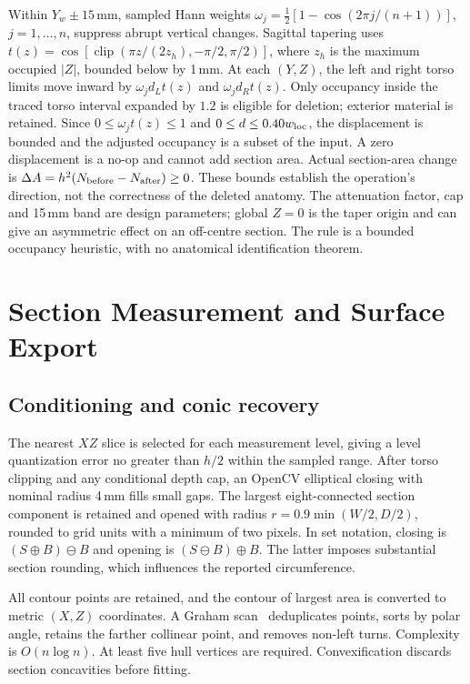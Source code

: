 \documentclass[11pt,a4paper]{article}
\newcommand{\clip}{\operatorname{clip}}
\begin{document}
Within $Y_w\pm15$\,mm, sampled Hann weights $\omega_j=\tfrac12[1-\cos(2\pi j/(n+1))]$, $j=1,\ldots,n$, suppress abrupt vertical changes. Sagittal tapering uses $t(z)=\cos[\clip(\pi z/(2z_h),-\pi/2,\pi/2)]$, where $z_h$ is the maximum occupied $|Z|$, bounded below by 1\,mm. At each $(Y,Z)$, the left and right torso limits move inward by $\omega_jd_Lt(z)$ and $\omega_jd_Rt(z)$. Only occupancy inside the traced torso interval expanded by $1.2$ is eligible for deletion; exterior material is retained. Since $0\leq\omega_jt(z)\leq1$ and $0\leq d\leq0.40w_{\rm loc}$, the displacement is bounded and the adjusted occupancy is a subset of the input. A zero displacement is a no-op and cannot add section area. Actual section-area change is $\Delta A=h^2(N_{\rm before}-N_{\rm after})\geq0$. These bounds establish the operation's direction, not the correctness of the deleted anatomy. The attenuation factor, cap and 15\,mm band are design parameters; global $Z=0$ is the taper origin and can give an asymmetric effect on an off-centre section. The rule is a bounded occupancy heuristic, with no anatomical identification theorem.

\section{Section Measurement and Surface Export}
\subsection{Conditioning and conic recovery}
The nearest $XZ$ slice is selected for each measurement level, giving a level quantization error no greater than $h/2$ within the sampled range. After torso clipping and any conditional depth cap, an OpenCV elliptical closing with nominal radius 4\,mm fills small gaps. The largest eight-connected section component is retained and opened with radius $r=0.9\min(W/2,D/2)$, rounded to grid units with a minimum of two pixels. In set notation, closing is $(S\oplus B)\ominus B$ and opening is $(S\ominus B)\oplus B$. The latter imposes substantial section rounding, which influences the reported circumference.

All contour points are retained, and the contour of largest area is converted to metric $(X,Z)$ coordinates. A Graham scan~\cite{graham1972efficient} deduplicates points, sorts by polar angle, retains the farther collinear point, and removes non-left turns. Complexity is $O(n\log n)$. At least five hull vertices are required. Convexification discards section concavities before fitting.
\end{document}
